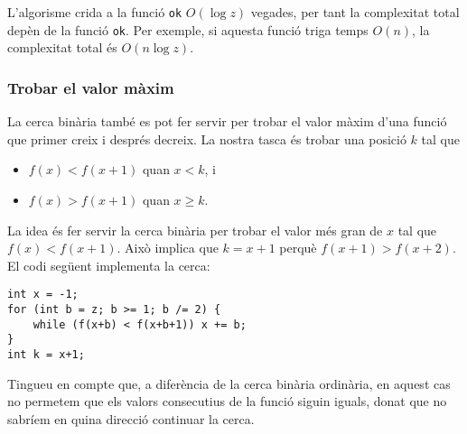 L'algorisme crida a la funció \texttt{ok}
$O(\log z)$ vegades, per tant la complexitat total
depèn de la funció \texttt{ok}.
Per exemple, si aquesta funció triga temps $O(n)$,
la complexitat total és $O(n \log z)$.

\subsubsection{Trobar el valor màxim}

La cerca binària també es pot fer servir per trobar
el valor màxim d'una funció que primer creix i després
decreix.
La nostra tasca és trobar una posició $k$ tal que

\begin{itemize}
\item
$f(x)<f(x+1)$ quan $x<k$, i
\item
$f(x)>f(x+1)$ quan $x \ge k$.
\end{itemize}

La idea és fer servir la cerca binària
per trobar el valor més gran de $x$
tal que $f(x)<f(x+1)$.
Això implica que $k=x+1$
perquè $f(x+1)>f(x+2)$.
El codi següent implementa la cerca:

\begin{lstlisting}
int x = -1;
for (int b = z; b >= 1; b /= 2) {
    while (f(x+b) < f(x+b+1)) x += b;
}
int k = x+1;
\end{lstlisting}

Tingueu en compte que, a diferència de la cerca binària ordinària,
en aquest cas no permetem que els valors consecutius
de la funció siguin iguals, donat que no sabríem
en quina direcció continuar la cerca.

